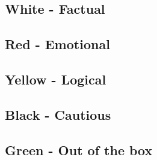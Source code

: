 \subsection{White - Factual}
\subsection{Red - Emotional}
\subsection{Yellow - Logical}
\subsection{Black - Cautious}
\subsection{Green - Out of the box}
